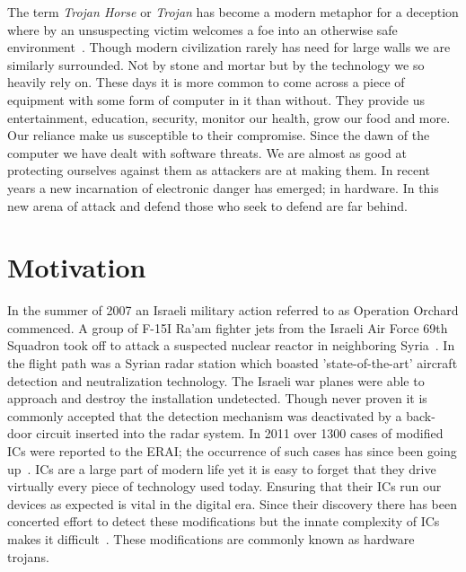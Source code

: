 \label{chapter:introduction}
The term \textit{Trojan Horse} or \textit{Trojan} has become a modern metaphor for a deception where by an unsuspecting victim welcomes a foe into an otherwise safe environment~\cite{searchForTrojanWar}.
Though modern civilization rarely has need for large walls we are similarly surrounded.
Not by stone and mortar but by the technology we so heavily rely on.
These days it is more common to come across a piece of equipment with some form of computer in it than without.
They provide us entertainment, education, security, monitor our health, grow our food and more.
Our reliance make us susceptible to their compromise.
Since the dawn of the computer we have dealt with software threats.
We are almost as good at protecting ourselves against them as attackers are at making them.
In recent years a new incarnation of electronic danger has emerged; in hardware.
In this new arena of attack and defend those who seek to defend are far behind.

\section{Motivation}
In the summer of 2007 an Israeli military action referred to as Operation Orchard commenced.
A group of F-15I Ra'am fighter jets from the Israeli Air Force 69th Squadron took off to attack a suspected nuclear reactor in neighboring Syria~\cite{stoppingHTsIEEESpectrum}.
In the flight path was a Syrian radar station which boasted 'state-of-the-art' aircraft detection and neutralization technology. 
The Israeli war planes were able to approach and destroy the installation undetected.
Though never proven it is commonly accepted that the detection mechanism was deactivated by a back-door circuit inserted into the radar system.
In 2011 over 1300 cases of modified \acrshort{IC}s were reported to the \acrfull{ERAI}; the occurrence of such cases has since been going up~\cite{counterfeitIEEESpectrum}.
\acrfull{ICs} are a large part of modern life yet it is easy to forget that they drive virtually every piece of technology used today.
Ensuring that their \acrshort{IC}s run our devices as expected is vital in the digital era.
Since their discovery there has been concerted effort to detect these modifications but the innate complexity of \acrshort{IC}s makes it difficult~\cite{hardwareTrojanSurvey2015}.
These modifications are commonly known as hardware trojans.


